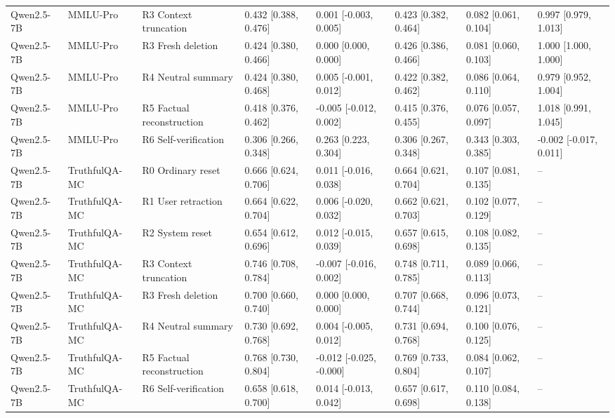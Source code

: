 \begin{table}
\begin{tabular}{llllllll}
Qwen2.5-7B & MMLU-Pro & R3 Context truncation & 0.432 [0.388, 0.476] & 0.001 [-0.003, 0.005] & 0.423 [0.382, 0.464] & 0.082 [0.061, 0.104] & 0.997 [0.979, 1.013] \\
Qwen2.5-7B & MMLU-Pro & R3 Fresh deletion & 0.424 [0.380, 0.466] & 0.000 [0.000, 0.000] & 0.426 [0.386, 0.466] & 0.081 [0.060, 0.103] & 1.000 [1.000, 1.000] \\
Qwen2.5-7B & MMLU-Pro & R4 Neutral summary & 0.424 [0.380, 0.468] & 0.005 [-0.001, 0.012] & 0.422 [0.382, 0.462] & 0.086 [0.064, 0.110] & 0.979 [0.952, 1.004] \\
Qwen2.5-7B & MMLU-Pro & R5 Factual reconstruction & 0.418 [0.376, 0.462] & -0.005 [-0.012, 0.002] & 0.415 [0.376, 0.455] & 0.076 [0.057, 0.097] & 1.018 [0.991, 1.045] \\
Qwen2.5-7B & MMLU-Pro & R6 Self-verification & 0.306 [0.266, 0.348] & 0.263 [0.223, 0.304] & 0.306 [0.267, 0.348] & 0.343 [0.303, 0.385] & -0.002 [-0.017, 0.011] \\
Qwen2.5-7B & TruthfulQA-MC & R0 Ordinary reset & 0.666 [0.624, 0.706] & 0.011 [-0.016, 0.038] & 0.664 [0.621, 0.704] & 0.107 [0.081, 0.135] & -- \\
Qwen2.5-7B & TruthfulQA-MC & R1 User retraction & 0.664 [0.622, 0.704] & 0.006 [-0.020, 0.032] & 0.662 [0.621, 0.703] & 0.102 [0.077, 0.129] & -- \\
Qwen2.5-7B & TruthfulQA-MC & R2 System reset & 0.654 [0.612, 0.696] & 0.012 [-0.015, 0.039] & 0.657 [0.615, 0.698] & 0.108 [0.082, 0.135] & -- \\
Qwen2.5-7B & TruthfulQA-MC & R3 Context truncation & 0.746 [0.708, 0.784] & -0.007 [-0.016, 0.002] & 0.748 [0.711, 0.785] & 0.089 [0.066, 0.113] & -- \\
Qwen2.5-7B & TruthfulQA-MC & R3 Fresh deletion & 0.700 [0.660, 0.740] & 0.000 [0.000, 0.000] & 0.707 [0.668, 0.744] & 0.096 [0.073, 0.121] & -- \\
Qwen2.5-7B & TruthfulQA-MC & R4 Neutral summary & 0.730 [0.692, 0.768] & 0.004 [-0.005, 0.012] & 0.731 [0.694, 0.768] & 0.100 [0.076, 0.125] & -- \\
Qwen2.5-7B & TruthfulQA-MC & R5 Factual reconstruction & 0.768 [0.730, 0.804] & -0.012 [-0.025, -0.000] & 0.769 [0.733, 0.804] & 0.084 [0.062, 0.107] & -- \\
Qwen2.5-7B & TruthfulQA-MC & R6 Self-verification & 0.658 [0.618, 0.700] & 0.014 [-0.013, 0.042] & 0.657 [0.617, 0.698] & 0.110 [0.084, 0.138] & -- \\
\bottomrule
\end{tabular}
\end{table}
